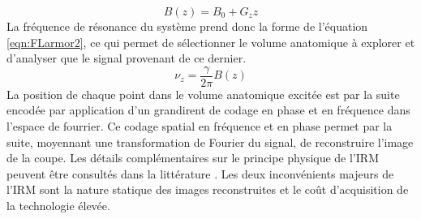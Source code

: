 %
\begin{equation}\label{eqn:Gradient}
	B(z)= B_{0}+G_{z}z
\end{equation}
%
La fréquence de résonance du système prend donc la forme de l’équation \eqref{eqn:FLarmor2}, ce qui permet de sélectionner le volume anatomique à explorer et d’analyser que le signal provenant de ce dernier.
%
\begin{equation}\label{eqn:FLarmor2}
	\nu_{z}= \frac{\gamma}{2\pi}B(z)
\end{equation}
%
La position de chaque point dans le volume anatomique excitée est par la suite encodée par application d’un grandirent de codage en phase et en fréquence dans l’espace de fourrier. Ce codage spatial en fréquence et en phase permet par la suite, moyennant une transformation de Fourier du signal, de reconstruire l’image de la coupe. Les détails complémentaires sur le principe physique de l’IRM peuvent être consultés dans la littérature \cite{Bushberg, Grover, HENDEE}. Les deux inconvénients majeurs de l’IRM sont la nature statique des images reconstruites et le coût d’acquisition de la technologie élevée.
%
